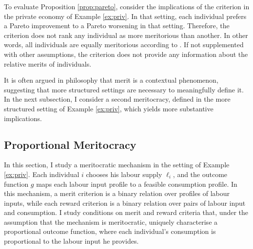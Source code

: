 To evaluate Proposition \ref{prop:pareto}, consider the implications of the  criterion in the private economy of Example \ref{ex:priv}. In that setting, each individual prefers a Pareto improvement to a Pareto worsening in that setting. Therefore, the  criterion does not rank any individual as more meritorious than another. In other words, all individuals are equally meritorious according to . If not supplemented with other assumptions, the  criterion does not provide any information about the relative merits of individuals.

It is often argued in philosophy that merit is a contextual phenomenon, suggesting that more structured settings are necessary to meaningfully define it. In the next subsection, I consider a second meritocracy, defined in the more structured setting of Example \ref{ex:priv}, which yields more substantive implications.

\subsection{Proportional Meritocracy}\label{subsec:prop}

In this section, I study a meritocratic mechanism in the setting of Example \ref{ex:priv}. Each individual \( i \) chooses his labour supply \( \ell_i \), and the outcome function \( g \) maps each labour input profile to a feasible consumption profile. In this mechanism, a merit criterion is a binary relation over profiles of labour inputs, while each reward criterion is a binary relation over pairs of labour input and consumption. I study conditions on merit and reward criteria that, under the assumption that the mechanism is meritocratic, uniquely characterise a proportional outcome function, where each individual's consumption is proportional to the labour input he provides.

